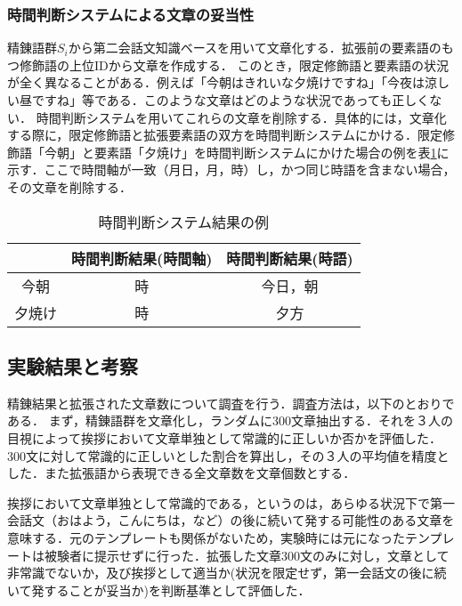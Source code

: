 \subsubsection{時間判断システムによる文章の妥当性}
精錬語群$S_i$から第二会話文知識ベースを用いて文章化する．拡張前の要素語のもつ修飾語の上位IDから文章を作成する．
このとき，限定修飾語と要素語の状況が全く異なることがある．例えば「今朝はきれいな夕焼けですね」「今夜は涼しい昼ですね」等である．このような文章はどのような状況であっても正しくない．
時間判断システムを用いてこれらの文章を削除する．具体的には，文章化する際に，限定修飾語と拡張要素語の双方を時間判断システムにかける．限定修飾語「今朝」と要素語「夕焼け」を時間判断システムにかけた場合の例を表\ref{tb:timejudgekekka}に示す．ここで時間軸が一致（月日，月，時）し，かつ同じ時語を含まない場合，その文章を削除する．
\begin{table}[htbp]
	\caption{時間判断システム結果の例}
	\begin{center}
		\begin{tabular}{|c|c|c|}
		\hline
		 & 時間判断結果(時間軸) & 時間判断結果(時語) \\ \hline
		今朝 	& 時 	& 今日，朝 \\ \hline
		夕焼け 	& 時	& 夕方\\ \hline
		\end{tabular}
	\end{center}
	\label{tb:timejudgekekka}
\end{table}
\subsection{実験結果と考察} \label{kosatsu}
精錬結果と拡張された文章数について調査を行う．調査方法は，以下のとおりである．
まず，精錬語群を文章化し，ランダムに300文章抽出する．それを３人の目視によって挨拶において文章単独として常識的に正しいか否かを評価した．300文に対して常識的に正しいとした割合を算出し，その３人の平均値を精度とした．また拡張語から表現できる全文章数を文章個数とする．

挨拶において文章単独として常識的である，というのは，あらゆる状況下で第一会話文（おはよう，こんにちは，など）の後に続いて発する可能性のある文章を意味する．元のテンプレートも関係がないため，実験時には元になったテンプレートは被験者に提示せずに行った．拡張した文章300文のみに対し，文章として非常識でないか，及び挨拶として適当か(状況を限定せず，第一会話文の後に続いて発することが妥当か)を判断基準として評価した．
